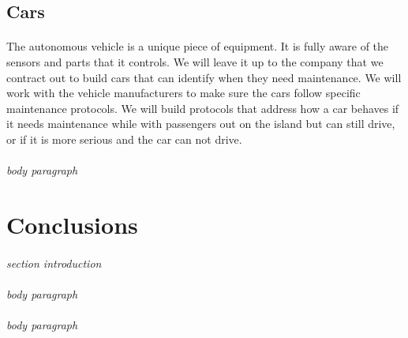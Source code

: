 \documentclass[12pt]{article}
\begin{document}
	\subsection{Cars}
	\paragraph{} The autonomous vehicle is a unique piece of equipment. It is fully 
	aware of the sensors and parts that it controls. We will leave it up to the 
	company that we contract out to build cars that can identify when they need 
	maintenance. We will work with the vehicle manufacturers to make sure the cars 
	follow specific maintenance protocols. We will build protocols that address how 
	a car behaves if it needs maintenance while with passengers out on the island but 
	can still drive, or if it is more serious and the car can not drive.
	
	\paragraph{} \textit{body paragraph}
	
\section{Conclusions}
\paragraph{} \textit{section introduction} 
\paragraph{} \textit{body paragraph}
\paragraph{} \textit{body paragraph}


\end{document}
